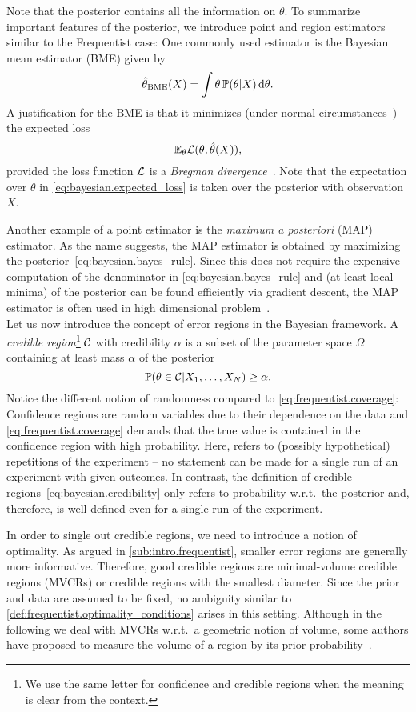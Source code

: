 Note that the posterior contains all the information on $\theta$.
To summarize important features of the posterior, we introduce point and region estimators similar to the Frequentist case:
One commonly used estimator is the Bayesian mean estimator (BME) given by
\[
  \hat\theta_\mathrm{BME}(X) = \int \theta \, \mathbb{P}(\theta | X) \, \mathrm{d}\theta.
\]
A justification for the BME is that it minimizes (under normal circumstances~\cite{Lehmann_1998_Theory}) the expected loss
\[
  \label{eq:bayesian.expected_loss}
  \mathbb{E}_\theta \mathcal{L}(\theta, \hat\theta(X)),
\]
provided the loss function $\mathcal{L}$ is a \emph{Bregman divergence}~\cite{Banerjee_2005_On}.
Note that the expectation over $\theta$ in \cref{eq:bayesian.expected_loss} is taken over the posterior with observation $X$.

Another example of a point estimator is the \emph{maximum a posteriori} (MAP) estimator.
As the name suggests, the MAP estimator is obtained by maximizing the posterior~\eqref{eq:bayesian.bayes_rule}.
Since this does not require the expensive computation of the denominator in \cref{eq:bayesian.bayes_rule} and (at least local minima) of the posterior can be found efficiently via gradient descent, the MAP estimator is often used in high dimensional problem~\cite{Murphy_2012_Machine}.\\


Let us now introduce the concept of error regions in the Bayesian framework.
A \emph{credible region}\footnote{%
  We use the same letter for confidence and credible regions when the meaning is clear from the context.
}
$\mathcal{C}$ with credibility $\alpha$ is a subset of the parameter space $\Omega$ containing at least mass $\alpha$ of the posterior
\[
  \label{eq:bayesian.credibility}
  \mathbb{P}(\theta \in \mathcal{C} | X_1, \ldots, X_N) \ge \alpha.
\]
Notice the different notion of randomness compared to \cref{eq:frequentist.coverage}:
Confidence regions are random variables due to their dependence on the data and \cref{eq:frequentist.coverage} demands that the true value is contained in the confidence region with high probability.
Here,  refers to (possibly hypothetical) repetitions of the experiment -- no statement can be made for a single run of an experiment with given outcomes.
In contrast, the definition of credible regions~\eqref{eq:bayesian.credibility} only refers to probability w.r.t.\ the posterior and, therefore, is well defined even for a single run of the experiment.

In order to single out  credible regions, we need to introduce a notion of optimality.
As argued in \cref{sub:intro.frequentist}, smaller error regions are generally more informative.
Therefore, good credible regions are minimal-volume credible regions (MVCRs) or credible regions with the smallest diameter.
Since the prior and data are  assumed to be fixed, no ambiguity similar to \cref{def:frequentist.optimality_conditions} arises in this setting.
Although in the following we deal with MVCRs w.r.t.\ a geometric notion of volume, some authors have proposed to measure the volume of a region by its prior probability~\cite{Evans_2006_Optimally,Shang_2013_Optimal}.



